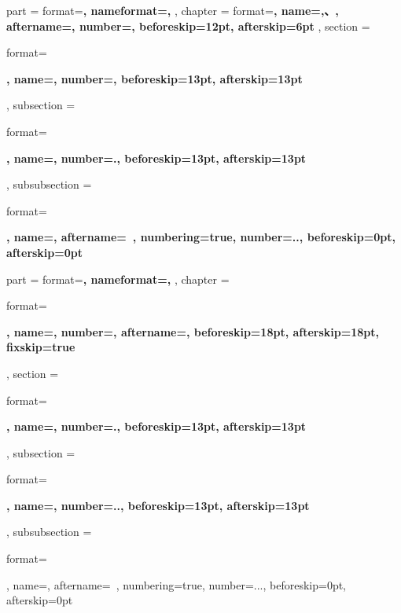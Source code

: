 {
    \ctexset
    {
        part =
        {
            format=\centering{}\bfseries,
            nameformat=\centering\heiti\fontsize{48}{48}\bfseries,
        },
        chapter =
        {
            format=\centering{}\bfseries,
            name={,、},
            aftername=,
            number=,
            beforeskip=12pt,
            afterskip=6pt
        },
        section =
        {
            format=\raggedright{}\bfseries,
            name={},
            number=,
            beforeskip=13pt,
            afterskip=13pt
        },
        subsection =
        {
            format=\raggedright{}\bfseries,
            name={},
            number=.,
            beforeskip=13pt,
            afterskip=13pt
        },
        subsubsection =
        {
            format=\raggedright{}\bfseries,
            name={},
            aftername=~,
            numbering=true,
            number=..,
            beforeskip=0pt,
            afterskip=0pt
        }
    }
}
{
    \ctexset
    {
        part =
        {
            format=\centering{}\bfseries,
            nameformat=\centering\heiti\fontsize{48}{48}\bfseries,
        },
        chapter =
        {
            format=\raggedright{}\bfseries,
            name={},
            number=,
            aftername=\space,
            beforeskip=18pt,
            afterskip=18pt,
            fixskip=true
        },
        section =
        {
            format=\raggedright{}\bfseries,
            name={},
            number=.,
            beforeskip=13pt,
            afterskip=13pt
        },
        subsection =
        {
            format=\raggedright{}\bfseries,
            name={},
            number=..,
            beforeskip=13pt,
            afterskip=13pt
        },
        subsubsection =
        {
            format=\raggedright{},
            name={},
            aftername=~,
            numbering=true,
            number=...,
            beforeskip=0pt,
            afterskip=0pt
        }
    }
}

\makeatletter
{}
\makeatother

